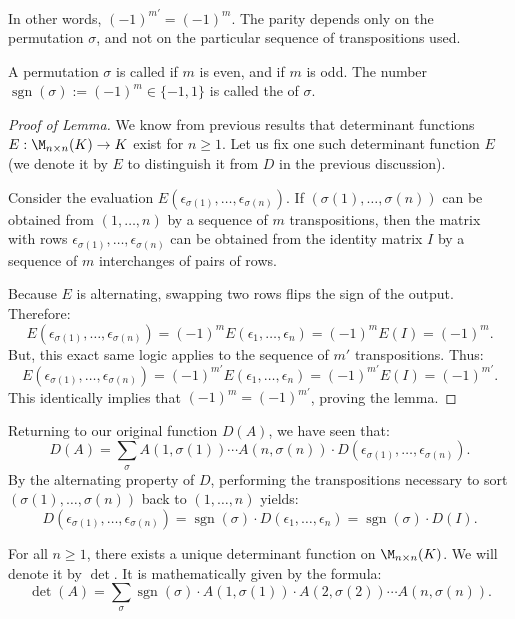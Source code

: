 In other words, $(-1)^{m'} = (-1)^m$. The parity depends only on the permutation $\sigma$, and not on the particular sequence of transpositions used.

A permutation $\sigma$ is called  if $m$ is even, and  if $m$ is odd. The number $\operatorname{sgn}(\sigma) := (-1)^m \in \{-1, 1\}$ is called the  of $\sigma$.

\begin{proof}[Proof of Lemma]
  We know from previous results that determinant functions $E : \M_{n \times n}(K) \to K$ exist for $n \ge 1$. Let us fix one such determinant function $E$ (we denote it by $E$ to distinguish it from $D$ in the previous discussion).

  Consider the evaluation $E(\epsilon_{\sigma(1)}, \dots, \epsilon_{\sigma(n)})$. If $(\sigma(1), \dots, \sigma(n))$ can be obtained from $(1, \dots, n)$ by a sequence of $m$ transpositions, then the matrix with rows $\epsilon_{\sigma(1)}, \dots, \epsilon_{\sigma(n)}$ can be obtained from the identity matrix $I$ by a sequence of $m$ interchanges of pairs of rows.

  Because $E$ is alternating, swapping two rows flips the sign of the output. Therefore:
  \[
  E(\epsilon_{\sigma(1)}, \dots, \epsilon_{\sigma(n)}) = (-1)^m E(\epsilon_1, \dots, \epsilon_n) = (-1)^m E(I) = (-1)^m.
  \]
  But, this exact same logic applies to the sequence of $m'$ transpositions. Thus:
  \[
  E(\epsilon_{\sigma(1)}, \dots, \epsilon_{\sigma(n)}) = (-1)^{m'} E(\epsilon_1, \dots, \epsilon_n) = (-1)^{m'} E(I) = (-1)^{m'}.
  \]
  This identically implies that $(-1)^m = (-1)^{m'}$, proving the lemma.
\end{proof}

Returning to our original function $D(A)$, we have seen that:
\[
D(A) = \sum_{\sigma} A(1,\sigma(1)) \cdots A(n,\sigma(n)) \cdot D(\epsilon_{\sigma(1)}, \dots, \epsilon_{\sigma(n)}).
\]
By the alternating property of $D$, performing the transpositions necessary to sort $(\sigma(1), \dots, \sigma(n))$ back to $(1, \dots, n)$ yields:
\begin{equation} \label{eq:det_relation}
  D(\epsilon_{\sigma(1)}, \dots, \epsilon_{\sigma(n)}) = \operatorname{sgn}(\sigma) \cdot D(\epsilon_1, \dots, \epsilon_n) = \operatorname{sgn}(\sigma) \cdot D(I).
\end{equation}

\begin{theorem}
  \label{thm:unique_det}
  For all $n \ge 1$, there exists a unique determinant function on $\M_{n \times n}(K)$. We will denote it by $\det$. It is mathematically given by the formula:
  \[
  \det(A) = \sum_{\sigma} \operatorname{sgn}(\sigma) \cdot A(1,\sigma(1)) \cdot A(2,\sigma(2)) \cdots A(n,\sigma(n)).
  \]
\end{theorem}

